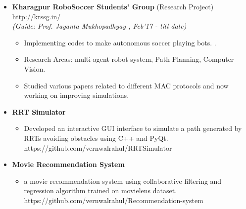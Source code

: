 \documentclass[a4paper,10pt]{article}
\newcommand{\isep}{-2 pt}
\begin{document}
\begin{itemize}
\item \textbf{Kharagpur  RoboSoccer  Students'  Group} (Research Project) \hspace{0.5cm}
{http://krssg.in/}\\
 \emph{(Guide: Prof. Jayanta Mukhopadhyay
, Feb'17 - till date)} \\[-0.6cm]
	\begin{itemize}\itemsep \isep
	\item Implementing codes to make autonomous soccer playing bots. 
.
	\item Research Areas: multi-agent robot system, Path Planning, Computer Vision.

	\item Studied various papers related to different MAC protocols and now working on improving simulations.

	\end{itemize} 

\item \textbf{RRT Simulator} 
	\begin{itemize}\itemsep \isep
	\item Developed an interactive GUI interface to simulate a path generated by RRTs avoiding obstacles using C++ and PyQt. \hspace{0.5cm} 
    {https://github.com/vernwalrahul/RRTSimulator} 
	\end{itemize}
	

	
\item \textbf{Movie Recommendation System} 
	\begin{itemize}\itemsep \isep
	\item a movie recommendation system using collaborative filtering and regression algorithm trained on movielens dataset. \hspace{0.5cm}
	 {https://github.com/vernwalrahul/Recommendation-system} 

	\end{itemize}	
\end{itemize}
\end{document}
